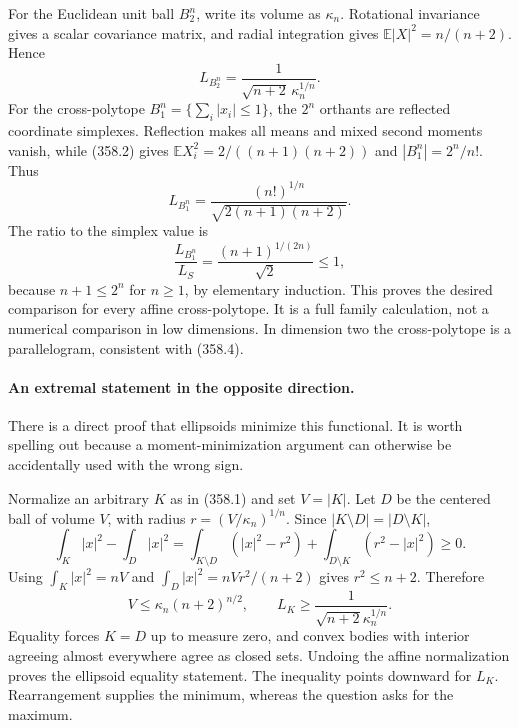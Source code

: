 \documentclass[11pt]{article}
\begin{document}
For the Euclidean unit ball $B_2^n$, write its volume as $\kappa_n$.
Rotational invariance gives a scalar covariance matrix, and radial
integration gives $\mathbb E|X|^2=n/(n+2)$. Hence
\[
 L_{B_2^n}=\frac1{\sqrt{n+2}\,\kappa_n^{1/n}}.
 \tag{358.5}
\]
For the cross-polytope $B_1^n=\{\sum_i|x_i|\leq1\}$, the
$2^n$ orthants are reflected coordinate simplexes. Reflection makes
all means and mixed second moments vanish, while (358.2) gives
$\mathbb E X_i^2=2/((n+1)(n+2))$ and $|B_1^n|=2^n/n!$.
Thus
\[
 L_{B_1^n}=\frac{(n!)^{1/n}}{\sqrt{2(n+1)(n+2)}}.
 \tag{358.6}
\]
The ratio to the simplex value is
\[
 \frac{L_{B_1^n}}{L_S}
   =\frac{(n+1)^{1/(2n)}}{\sqrt2}\leq1,
 \tag{358.7}
\]
because $n+1\leq2^n$ for $n\geq1$, by elementary induction.
This proves the desired comparison for every affine cross-polytope.
It is a full family calculation, not a numerical comparison in low
dimensions. In dimension two the cross-polytope is a parallelogram,
consistent with (358.4).

\paragraph{An extremal statement in the opposite direction.}
There is a direct proof that ellipsoids minimize this functional. It
is worth spelling out because a moment-minimization argument can
otherwise be accidentally used with the wrong sign.

Normalize an arbitrary $K$ as in (358.1) and set $V=|K|$. Let $D$
be the centered ball of volume $V$, with radius
$r=(V/\kappa_n)^{1/n}$. Since $|K\setminus D|=|D\setminus K|$,
\[
 \int_K|x|^2-\int_D|x|^2
 =\int_{K\setminus D}(|x|^2-r^2)
   +\int_{D\setminus K}(r^2-|x|^2)\geq0.
\]
Using $\int_K|x|^2=nV$ and
$\int_D|x|^2=nVr^2/(n+2)$ gives $r^2\leq n+2$. Therefore
\[
 V\leq\kappa_n(n+2)^{n/2},\qquad
 L_K\geq\frac1{\sqrt{n+2}\kappa_n^{1/n}}.
 \tag{358.8}
\]
Equality forces $K=D$ up to measure zero, and convex bodies with
interior agreeing almost everywhere agree as closed sets. Undoing
the affine normalization proves the ellipsoid equality statement.
The inequality points downward for $L_K$. Rearrangement supplies
the minimum, whereas the question asks for the maximum.
\end{document}
